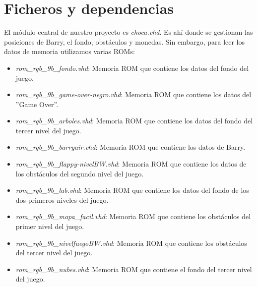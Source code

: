 \documentclass[11pt, a4paper, spanish, openright, twoside]{book}
\begin{document}
\newpage
\mbox{}
\thispagestyle{empty}						%
\newpage


\tableofcontents 							%

\newpage
\mbox{}
\thispagestyle{empty}						%
\newpage


\vspace{3cm}


\section{Ficheros y dependencias}
El módulo central de nuestro proyecto es \textit{choca.vhd}. Es ahí donde se gestionan las posiciones de Barry, el fondo, obstáculos y monedas. Sin embargo, para leer los datos de memoria utilizamos varias ROMs:
\begin{itemize}
\item \textit{rom\_rgb\_9b\_fondo.vhd}: Memoria ROM que contiene los datos del fondo del juego.
\item \textit{rom\_rgb\_9b\_game-over-negro.vhd}: Memoria ROM que contiene los datos del ''Game Over''.
\item \textit{rom\_rgb\_9b\_arboles.vhd}: Memoria ROM que contiene los datos del fondo del tercer nivel del juego.
\item \textit{rom\_rgb\_9b\_barryair.vhd}: Memoria ROM que contiene los datos de Barry.
\item \textit{rom\_rgb\_9b\_flappy-nivelBW.vhd}: Memoria ROM que contiene los datos de los obstáculos del segundo nivel del juego.
\item \textit{rom\_rgb\_9b\_lab.vhd}: Memoria ROM que contiene los datos del fondo de los dos primeros niveles del juego.
\item \textit{rom\_rgb\_9b\_mapa\_facil.vhd}: Memoria ROM que contiene los obstáculos del primer nivel del juego.
\item \textit{rom\_rgb\_9b\_nivelfuegoBW.vhd}: Memoria ROM que contiene los obstáculos del tercer nivel del juego.
\item \textit{rom\_rgb\_9b\_nubes.vhd}: Memoria ROM que contiene el fondo del tercer nivel del juego.
\end{itemize}
\end{document}
